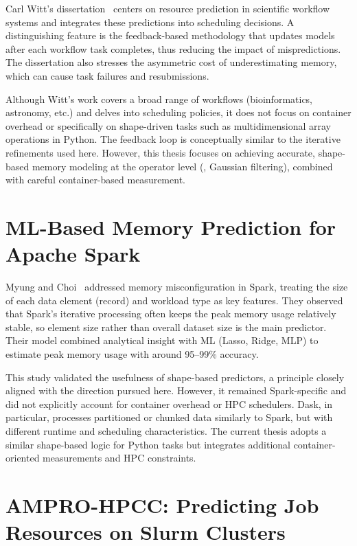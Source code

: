 Carl Witt's dissertation~\cite{witt2020} centers on resource prediction in scientific workflow systems and integrates these predictions into scheduling decisions.
A distinguishing feature is the feedback-based methodology that updates models after each workflow task completes, thus reducing the impact of mispredictions.
The dissertation also stresses the asymmetric cost of underestimating memory, which can cause task failures and resubmissions.

Although Witt's work covers a broad range of workflows (bioinformatics, astronomy, etc.) and delves into scheduling policies, it does not focus on container overhead or specifically on shape-driven tasks such as multidimensional array operations in Python.
The feedback loop is conceptually similar to the iterative refinements used here. However, this thesis focuses on achieving accurate, shape-based memory modeling at the operator level (\eg, Gaussian filtering), combined with careful container-based measurement.


\section{\ac{ML}-Based Memory Prediction for Apache Spark}
\label{sec:rw-spark-prediction}

Myung and Choi~\cite{myung2021} addressed memory misconfiguration in Spark, treating the size of each data element (record) and workload type as key features.
They observed that Spark's iterative processing often keeps the peak memory usage relatively stable, so element size rather than overall dataset size is the main predictor.
Their model combined analytical insight with \ac{ML} (Lasso, Ridge, \ac{MLP}) to estimate peak memory usage with around 95--99\% accuracy.

This study validated the usefulness of shape-based predictors, a principle closely aligned with the direction pursued here.
However, it remained Spark-specific and did not explicitly account for container overhead or \ac{HPC} schedulers.
Dask, in particular, processes partitioned or chunked data similarly to Spark, but with different runtime and scheduling characteristics.
The current thesis adopts a similar shape-based logic for Python tasks but integrates additional container-oriented measurements and \ac{HPC} constraints.


\section{AMPRO-HPCC: Predicting Job Resources on Slurm Clusters}
\label{sec:rw-ampro-hpcc}

